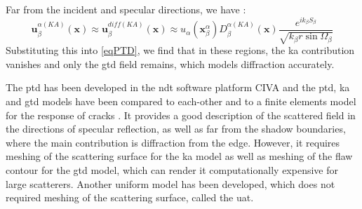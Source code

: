 Far from the incident and specular directions, we have :
\begin{equation}
\mathbf{u}_{\beta}^{\alpha(KA)}(\mathbf{x})\approx \mathbf{u}_{\beta}^{diff(KA)}(\mathbf{x}) \approx u_{\alpha}(\mathbf{x}_{\beta}^{\alpha})D_{\beta}^{\alpha(KA)}(\mathbf{x})\dfrac{e^{ik_{\beta}S_{\beta}}}{\sqrt{k_{\beta}r\sin\Omega_{\beta}}}
\end{equation}
Substituting this into \eqref{eqPTD}, we find that in these regions, the \acrshort{ka} contribution vanishes and only the \acrshort{gtd} field remains, which models diffraction accurately.

The \acrfull{ptd} has been developed in the \acrshort{ndt} software platform CIVA and the \acrshort{ptd}, \acrshort{ka} and \acrshort{gtd} models have been compared to each-other and to a finite elements model for the response of cracks \cite{systmodel}. It provides a good description of the scattered field in the directions of specular reflection, as well as far from the shadow boundaries, where the main contribution is diffraction from the edge. However, it requires meshing of the scattering surface for the \acrshort{ka} model as well as meshing of the flaw contour for the \acrshort{gtd} model, which can render it computationally expensive for large scatterers. Another uniform model has been developed, which does not required meshing of the scattering surface, called the \acrfull{uat}.

